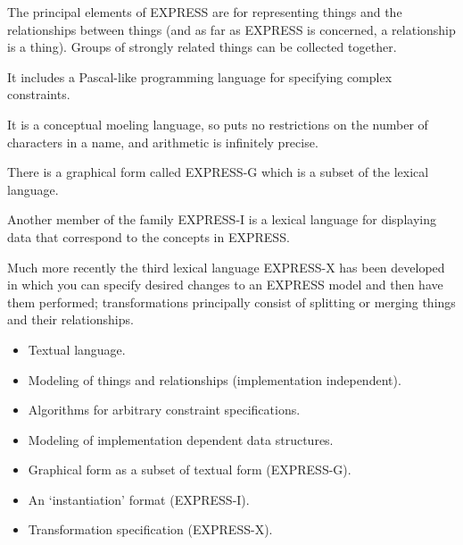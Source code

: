 \begin{remarks}
\remintro


    The principal elements of EXPRESS are for representing things
and the relationships between things (and as far as EXPRESS is concerned,
a relationship is a thing). Groups of strongly related things can be
collected together.

    It includes a Pascal-like programming language for specifying complex
constraints.

    It is a conceptual moeling language, so puts no restrictions on the 
number of characters in a name, and arithmetic is infinitely precise.

   There is a graphical form called EXPRESS-G which is a subset of the lexical
language.

   Another member of the family EXPRESS-I is a lexical language for displaying
data that correspond to the concepts in EXPRESS.

    Much more recently the third lexical language EXPRESS-X has been developed
in which you can specify desired changes to an EXPRESS model and then have
them performed; transformations principally consist of splitting or merging
things and their relationships.

\remend
\end{remarks}


  \begin{itemize}
  \item Textual language.
  \item Modeling of things and relationships (implementation independent).
  \item Algorithms for arbitrary constraint specifications.
  \item Modeling of implementation dependent data structures.
  \item Graphical form as a subset of textual form (EXPRESS-G).
  \item An `instantiation' format (EXPRESS-I).
  \item Transformation specification (EXPRESS-X).
  \end{itemize}

